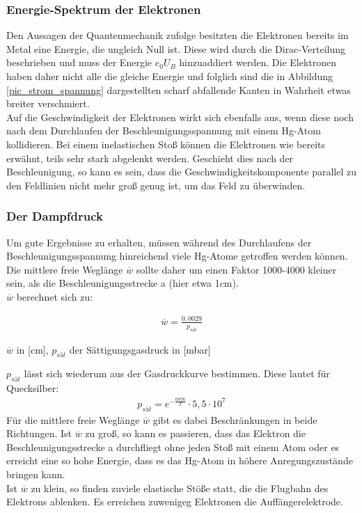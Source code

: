 \subsubsection{Energie-Spektrum der Elektronen}
Den Aussagen der Quantenmechanik zufolge besitzten die Elektronen bereits im Metal eine Energie, die ungleich Null ist. Diese wird durch die Dirac-Verteilung beschrieben und muss der Energie $e_0 U_B$ hinzuaddiert werden.
Die Elektronen haben daher nicht alle die gleiche Energie und folglich sind die in Abbildung \ref{pic_strom_spannung} dargestellten scharf abfallende Kanten in Wahrheit etwas breiter verschmiert.\\
Auf die Geschwindigkeit der Elektronen wirkt sich ebenfalls aus, wenn diese noch nach dem Durchlaufen der Beschleunigungsspannung mit einem Hg-Atom kollidieren. Bei einem inelastischen Stoß können die Elektronen wie bereits erwähnt, teils sehr stark abgelenkt werden. Geschieht dies nach der Beschleunigung, so kann  es sein, dass die Geschwindigkeitskomponente parallel zu den Feldlinien nicht mehr groß genug ist, um das Feld zu überwinden.
\subsubsection{Der Dampfdruck}
\label{sec_dampfdruck}
Um gute Ergebnisse zu erhalten, müssen während des Durchlaufens der Beschleunigungsspannung hinreichend viele Hg-Atome getroffen werden können. Die mittlere freie Weglänge $\overline{w}$ sollte daher um einen Faktor 1000-4000 kleiner sein, als die Beschleunigungsstrecke a (hier etwa 1cm).\\

$\overline{w}$ berechnet sich zu:
\begin{formel}[H]
\begin{align}
\overline{w} = \frac{0,0029}{p_{sät}}
\label{eq_weglaenge}
\end{align}
\caption*{\small{$\overline{w}$ in [cm], $p_{sät}$ der Sättigungsgasdruck in [mbar]}}

\end{formel}
$p_{sät}$ lässt sich wiederum aus der Gasdruckkurve bestimmen. Diese lautet für Quecksilber:
\begin{align}
p_{sät} = 	e^{-\frac{6876}{T}} \cdot 5,5 \cdot10^{7}
\label{eq_sättigungsdruck}
\end{align}
Für die mittlere freie Weglänge $\overline{w}$ gibt es dabei Beschränkungen in beide Richtungen. Ist $\overline{w}$ zu groß, so kann es passieren, dass das Elektron die Beschleunigungsstrecke a durchfliegt ohne jeden Stoß mit einem Atom oder es erreicht eine so hohe Energie, dass es das Hg-Atom in höhere Anregungszustände bringen kann.\\
Ist $\overline{w}$ zu klein, so finden zuviele elastische Stöße statt, die die Flugbahn des Elektrons ablenken. Es erreichen zuwenigeg Elektronen die Auffängerelektrode.
